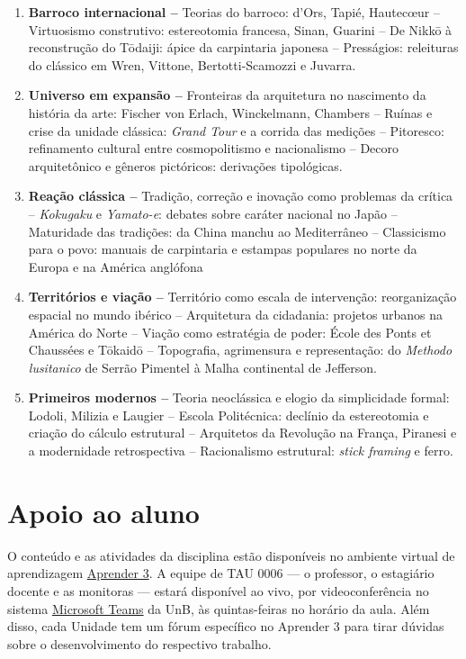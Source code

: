 \documentclass[
  11pt,
  brazil,
  a4paper,
]{article}
\begin{document}
\begin{enumerate}
\def\labelenumi{\arabic{enumi}.}
\setcounter{enumi}{10}
\item
  \textbf{Barroco internacional --} Teorias do barroco: d'Ors, Tapié,
  Hautecœur -- Virtuosismo construtivo: estereotomia francesa, Sinan,
  Guarini -- De Nikkō à reconstrução do Tōdaiji: ápice da carpintaria
  japonesa -- Presságios: releituras do clássico em Wren, Vittone,
  Bertotti-Scamozzi e Juvarra.
\item
  \textbf{Universo em expansão --} Fronteiras da arquitetura no
  nascimento da história da arte: Fischer von Erlach, Winckelmann,
  Chambers -- Ruínas e crise da unidade clássica: \emph{Grand Tour} e a
  corrida das medições -- Pitoresco: refinamento cultural entre
  cosmopolitismo e nacionalismo -- Decoro arquitetônico e gêneros
  pictóricos: derivações tipológicas.
\item
  \textbf{Reação clássica --} Tradição, correção e inovação como
  problemas da crítica -- \emph{Kokugaku} e \emph{Yamato-e}: debates
  sobre caráter nacional no Japão -- Maturidade das tradições: da China
  manchu ao Mediterrâneo -- Classicismo para o povo: manuais de
  carpintaria e estampas populares no norte da Europa e na América
  anglófona
\item
  \textbf{Territórios e viação --} Território como escala de
  intervenção: reorganização espacial no mundo ibérico -- Arquitetura da
  cidadania: projetos urbanos na América do Norte -- Viação como
  estratégia de poder: École des Ponts et Chaussées e Tōkaidō --
  Topografia, agrimensura e representação: do \emph{Methodo lusitanico}
  de Serrão Pimentel à Malha continental de Jefferson.
\item
  \textbf{Primeiros modernos --} Teoria neoclássica e elogio da
  simplicidade formal: Lodoli, Milizia e Laugier -- Escola Politécnica:
  declínio da estereotomia e criação do cálculo estrutural -- Arquitetos
  da Revolução na França, Piranesi e a modernidade retrospectiva --
  Racionalismo estrutural: \emph{stick framing} e ferro.
\end{enumerate}

\hypertarget{apoio-ao-aluno}{%
\section{Apoio ao aluno}\label{apoio-ao-aluno}}

O conteúdo e as atividades da disciplina estão disponíveis no ambiente
virtual de aprendizagem
\href{https://aprender3.unb.br/course/view.php?id=2766}{Aprender 3}. A
equipe de TAU 0006 --- o professor, o estagiário docente e as monitoras
--- estará disponível ao vivo, por videoconferência no sistema
\href{https://teams.microsoft.com}{Microsoft Teams} da UnB, às
quintas-feiras no horário da aula. Além disso, cada Unidade tem um fórum
específico no Aprender 3 para tirar dúvidas sobre o desenvolvimento do
respectivo trabalho.
\end{document}
